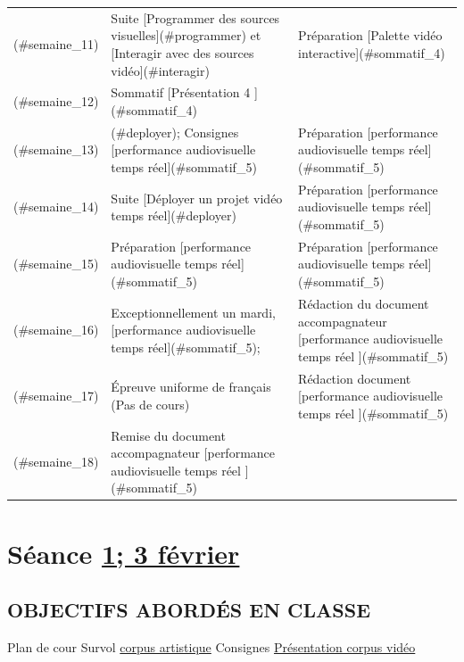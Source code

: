 \documentclass[
]{book}
\begin{document}
\begin{table}
\begin{tabular}[t]{>{\raggedright\arraybackslash}p{.5em}>{\raggedright\arraybackslash}p{10em}>{\raggedright\arraybackslash}p{10em}}
\addlinespace
[9; 14 avril](\#semaine\_11) & Suite [Programmer des sources visuelles](\#programmer) et [Interagir avec des sources vidéo](\#interagir) & Préparation [Palette vidéo interactive](\#sommatif\_4)\\
[10; 21 avril](\#semaine\_12) & Sommatif [Présentation 4 ](\#sommatif\_4) & \\
[11; 28 avril](\#semaine\_13) & [Déployer un projet vidéo temps réel](\#deployer); Consignes [performance audiovisuelle temps réel](\#sommatif\_5) & Préparation [performance audiovisuelle temps réel](\#sommatif\_5)\\
[12; 5 mai](\#semaine\_14) & Suite [Déployer un projet vidéo temps réel](\#deployer) & Préparation [performance audiovisuelle temps réel](\#sommatif\_5)\\
[13; 12 mai](\#semaine\_15) & Préparation [performance audiovisuelle temps réel](\#sommatif\_5) & Préparation [performance audiovisuelle temps réel](\#sommatif\_5)\\
\addlinespace
[14; 18 mai ](\#semaine\_16) & Exceptionnellement un mardi, [performance audiovisuelle temps réel](\#sommatif\_5); & Rédaction du document accompagnateur [performance audiovisuelle temps réel ](\#sommatif\_5)\\
[X; 19 mai](\#semaine\_17) & Épreuve uniforme de français (Pas de cours) & Rédaction document [performance audiovisuelle temps réel ](\#sommatif\_5)\\
[15; 25 mai](\#semaine\_18) & Remise du document accompagnateur [performance audiovisuelle temps réel ](\#sommatif\_5) & \\
\bottomrule
\end{tabular}
\end{table}

\hypertarget{semaine_1}{%
\section{\texorpdfstring{Séance \protect\hyperlink{semaine_1}{1; 3 février}}{Séance 1; 3 février}}\label{semaine_1}}

\hypertarget{objectifs-aborduxe9s-en-classe}{%
\subsection{OBJECTIFS ABORDÉS EN CLASSE}\label{objectifs-aborduxe9s-en-classe}}

Plan de cour Survol \protect\hyperlink{corpus}{corpus artistique} Consignes \protect\hyperlink{sommatif_1}{Présentation corpus vidéo}
\end{document}
